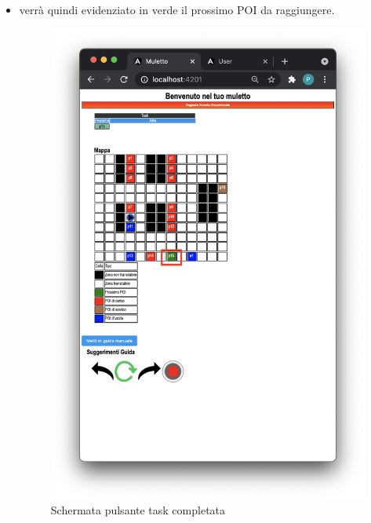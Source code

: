 \begin{itemize}
    \item verrà quindi evidenziato in verde il prossimo POI da raggiungere.
    \begin{figure}[H]
        \centering
        	\includegraphics[scale=0.45]{res/images/next.png}
        	\caption{Schermata pulsante task completata}
    \end{figure}
\end{itemize}
